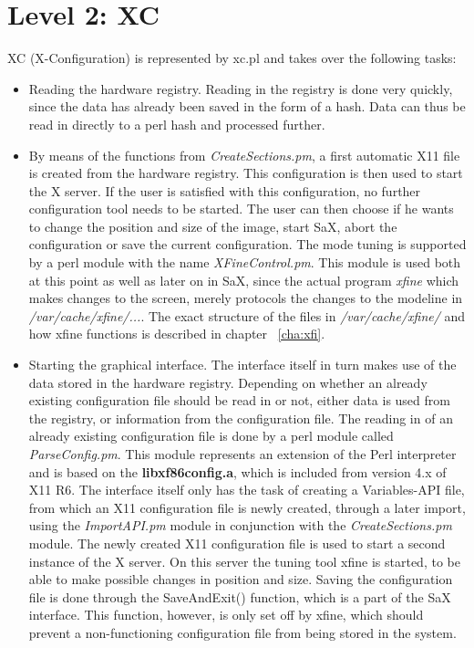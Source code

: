 \section{Level 2: XC}
\label{sec:le2}
XC (X-Configuration) is represented by xc.pl and 
takes over the following tasks:
\begin{itemize}
\item Reading the hardware registry. Reading in the registry is done very
  quickly, since the data has already been saved in the form of a hash. Data
  can thus be read in directly to a perl hash and processed further. 
\item By means of the functions from \textit{CreateSections.pm}, 
      a first automatic X11 file is created from the hardware registry. This
      configuration is then used to start the X server. If the user is
      satisfied with this configuration, no further configuration tool needs
      to be started. The user can then choose if he wants to change the
      position and size of the image, start SaX, abort the configuration or
      save the current configuration.  The mode tuning is supported by a perl
      module with the name \textit{XFineControl.pm}. This module is used both
      at this point as well as later on in SaX, since the actual program
      \textit{xfine} which makes changes to the screen, merely protocols the
      changes to the modeline in \textit{/var/cache/xfine/...}.
      The exact structure of the files in \textit{/var/cache/xfine/} and
      how xfine functions is described in chapter ~\ref{cha:xfi}.
\item Starting the graphical interface. The interface itself in turn makes use
  of the data stored in the hardware registry.
      Depending on whether an already existing configuration file should be
      read in or not, either data is used from the registry, or information
      from the configuration file. The reading in of an already existing
      configuration file is done by a perl module called
      \textit{ParseConfig.pm}. This module represents an extension of the 
      Perl interpreter and is based on the \textbf{libxf86config.a}, which is
      included from version 4.x of X11 R6. The interface itself only has the
      task of creating a Variables-API file, from which an X11 configuration
      file is newly created, through a later import, using the
      \textit{ImportAPI.pm} module in conjunction with the
      \textit{CreateSections.pm} module. The newly created X11 configuration
      file is used to start a second instance of the X server. On this server
      the tuning tool xfine is started, to be able to make possible changes in
      position and size. Saving the configuration file is done through the
      SaveAndExit() function, which is a part of the SaX interface. This
      function, however, is only set off by xfine, which should prevent a
      non-functioning configuration file from being stored in the system. 
\end{itemize}

